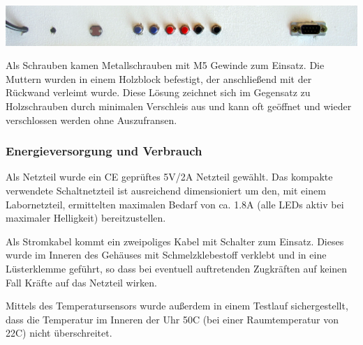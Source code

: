 \vspace{2em}
\centerline{\includegraphics[width=\linewidth]{images/anschluesse.png}}
\label{fig_anschluesse}
\vspace{.5em}

Als Schrauben kamen Metallschrauben mit M5 %
Gewinde zum Einsatz. Die Muttern wurden in einem Holzblock befestigt, der anschließend mit der Rückwand verleimt wurde.%
Diese Lösung zeichnet sich im Gegensatz zu Holzschrauben durch minimalen Verschleis aus und kann oft geöffnet und wieder verschlossen werden ohne Auszufransen.

\subsubsection{Energieversorgung und Verbrauch}
Als Netzteil wurde ein CE geprüftes 5V/2A Netzteil gewählt. Das kompakte verwendete Schaltnetzteil ist ausreichend dimensioniert um den, mit einem Labornetzteil, ermittelten maximalen Bedarf von ca. 1.8A (alle LEDs aktiv bei maximaler Helligkeit) bereitzustellen.
 
Als Stromkabel kommt ein zweipoliges Kabel mit Schalter zum Einsatz. Dieses wurde im Inneren des Gehäuses mit Schmelzklebestoff verklebt und in eine Lüsterklemme geführt, so dass bei eventuell auftretenden Zugkräften auf keinen Fall Kräfte auf das Netzteil wirken.

Mittels des Temperatursensors wurde außerdem in einem Testlauf sichergestellt, dass die Temperatur im Inneren der Uhr 50\degree C (bei einer Raumtemperatur von 22\degree C) nicht überschreitet.
